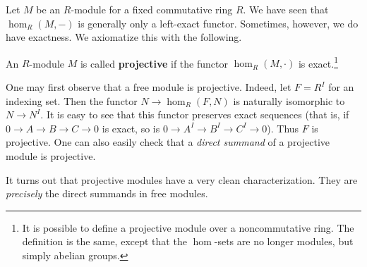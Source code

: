 Let $M$ be an $R$-module for a fixed commutative ring $R$. We have seen that
$\hom_R(M,-)$ is generally only a left-exact functor.
Sometimes, however, we do have exactness. We axiomatize this with the
following.

\begin{definition} \label{projectives}
An $R$-module $M$ is called \textbf{projective} if the functor $\hom_R(M,
\cdot)$ is
exact.\footnote{It is possible to define a projective module over a
noncommutative ring. The definition is the same, except that the $\hom$-sets
are no longer modules, but simply abelian groups. }
\end{definition}

One may first observe that a free module is projective.
Indeed, let $F = R^I$ for an indexing set. Then the functor $N \to \hom_R(F,
N)$ is
naturally
isomorphic to $N \to N^I$. It is easy to see that this functor preserves
exact sequences (that is, if $0 \to A \to B \to C \to 0$ is exact, so is $0
\to A^I \to B^I \to C^I \to 0$).
Thus $F$ is projective.
One can also easily check that a \emph{direct summand} of a projective module
is projective.

It turns out that projective modules have a very clean characterization. They
are  \emph{precisely} the direct
summands in free modules.

